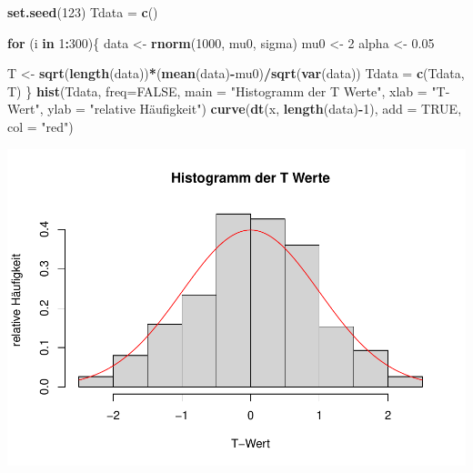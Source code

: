 \documentclass[]{article}
\newenvironment{Shaded}{\begin{snugshade}}{\end{snugshade}}
\newcommand{\ControlFlowTok}[1]{\textcolor[rgb]{0.13,0.29,0.53}{\textbf{#1}}}
\newcommand{\DataTypeTok}[1]{\textcolor[rgb]{0.13,0.29,0.53}{#1}}
\newcommand{\DecValTok}[1]{\textcolor[rgb]{0.00,0.00,0.81}{#1}}
\newcommand{\FloatTok}[1]{\textcolor[rgb]{0.00,0.00,0.81}{#1}}
\newcommand{\KeywordTok}[1]{\textcolor[rgb]{0.13,0.29,0.53}{\textbf{#1}}}
\newcommand{\NormalTok}[1]{#1}
\newcommand{\OperatorTok}[1]{\textcolor[rgb]{0.81,0.36,0.00}{\textbf{#1}}}
\newcommand{\OtherTok}[1]{\textcolor[rgb]{0.56,0.35,0.01}{#1}}
\newcommand{\StringTok}[1]{\textcolor[rgb]{0.31,0.60,0.02}{#1}}
\begin{document}
\begin{Shaded}
\begin{Highlighting}[]
\KeywordTok{set.seed}\NormalTok{(}\DecValTok{123}\NormalTok{)}
\NormalTok{Tdata =}\StringTok{ }\KeywordTok{c}\NormalTok{()}

\ControlFlowTok{for}\NormalTok{ (i }\ControlFlowTok{in} \DecValTok{1}\OperatorTok{:}\DecValTok{300}\NormalTok{)\{}
\NormalTok{  data <-}\StringTok{ }\KeywordTok{rnorm}\NormalTok{(}\DecValTok{1000}\NormalTok{, mu0, sigma)}
\NormalTok{  mu0 <-}\StringTok{ }\DecValTok{2}
\NormalTok{  alpha <-}\StringTok{ }\FloatTok{0.05}

\NormalTok{  T <-}\StringTok{ }\KeywordTok{sqrt}\NormalTok{(}\KeywordTok{length}\NormalTok{(data))}\OperatorTok{*}\NormalTok{(}\KeywordTok{mean}\NormalTok{(data)}\OperatorTok{-}\NormalTok{mu0)}\OperatorTok{/}\KeywordTok{sqrt}\NormalTok{(}\KeywordTok{var}\NormalTok{(data))}
\NormalTok{  Tdata =}\StringTok{ }\KeywordTok{c}\NormalTok{(Tdata, T)}
\NormalTok{\}}
\KeywordTok{hist}\NormalTok{(Tdata, }\DataTypeTok{freq=}\OtherTok{FALSE}\NormalTok{, }\DataTypeTok{main =} \StringTok{"Histogramm der T Werte"}\NormalTok{, }\DataTypeTok{xlab =} \StringTok{"T-Wert"}\NormalTok{, }\DataTypeTok{ylab =} \StringTok{"relative Häufigkeit"}\NormalTok{)}
\KeywordTok{curve}\NormalTok{(}\KeywordTok{dt}\NormalTok{(x, }\KeywordTok{length}\NormalTok{(data)}\OperatorTok{-}\DecValTok{1}\NormalTok{), }\DataTypeTok{add =} \OtherTok{TRUE}\NormalTok{, }\DataTypeTok{col =} \StringTok{"red"}\NormalTok{)}
\end{Highlighting}
\end{Shaded}

\includegraphics{Test_files/figure-latex/unnamed-chunk-5-1.pdf}
\end{document}
